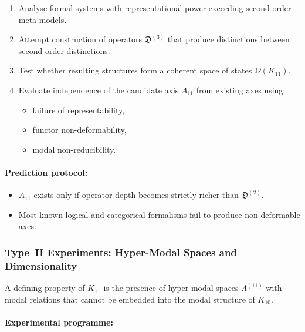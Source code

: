 \begin{enumerate}
    \item Analyse formal systems with representational power exceeding 
          second-order meta-models.
    \item Attempt construction of operators $\mathfrak{D}^{(3)}$ 
          that produce distinctions between second-order distinctions.
    \item Test whether resulting structures form a coherent space 
          of states $\Omega(K_{11})$.
    \item Evaluate independence of the candidate axis $A_{11}$ from 
          existing axes using:
          \begin{itemize}
              \item failure of representability,
              \item functor non-deformability,
              \item modal non-reducibility.
          \end{itemize}
\end{enumerate}

\paragraph{Prediction protocol:}

\begin{itemize}
    \item $A_{11}$ exists only if operator depth becomes strictly 
          richer than $\mathfrak{D}^{(2)}$.
    \item Most known logical and categorical formalisms fail to 
          produce non-deformable axes.
\end{itemize}



\subsubsection{Type~II Experiments: Hyper-Modal Spaces and Dimensionality}

A defining property of $K_{11}$ is the presence of 
hyper-modal spaces $\Lambda^{(11)}$ with modal relations that cannot 
be embedded into the modal structure of $K_{10}$.

\paragraph{Experimental programme:}

